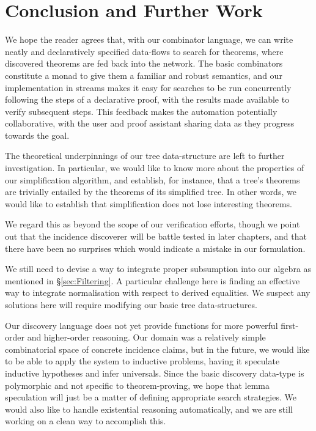 
\section{Conclusion and Further Work}
We hope the reader agrees that, with our combinator language, we can write neatly and declaratively specified data-flows to search for theorems, where discovered theorems are fed back into the network. The basic combinators constitute a monad to give them a familiar and robust semantics, and our implementation in streams makes it easy for searches to be run concurrently following the steps of a declarative proof, with the results made available to verify subsequent steps. This feedback makes the automation potentially collaborative, with the user and proof assistant sharing data as they progress towards the goal.

The theoretical underpinnings of our tree data-structure are left to further investigation. In particular, we would like to know more about the properties of our simplification algorithm, and establish, for instance, that a tree's theorems are trivially entailed by the theorems of its simplified tree. In other words, we would like to establish that simplification does not lose interesting theorems.

We regard this as beyond the scope of our verification efforts, though we point out that the incidence discoverer will be battle tested in later chapters, and that there have been no surprises which would indicate a mistake in our formulation.

We still need to devise a way to integrate proper subsumption into our algebra as mentioned in \S\ref{sec:Filtering}. A particular challenge here is finding an effective way to integrate normalisation with respect to derived equalities. We suspect any solutions here will require modifying our basic tree data-structures. 

Our discovery language does not yet provide functions for more powerful first-order and higher-order reasoning. Our domain was a relatively simple combinatorial space of concrete incidence claims, but in the future, we would like to be able to apply the system to inductive problems, having it speculate inductive hypotheses and infer universals. Since the basic discovery data-type is polymorphic and not specific to theorem-proving, we hope that lemma speculation will just be a matter of defining appropriate search strategies. We would also like to handle existential reasoning automatically, and we are still working on a clean way to accomplish this. 

